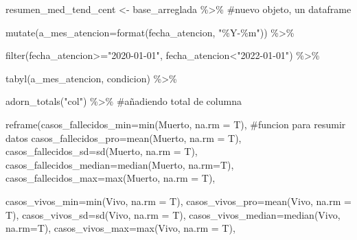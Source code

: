 \documentclass[
  letterpaper,
  DIV=11,
  numbers=noendperiod]{scrreprt}
\newenvironment{Shaded}{\begin{snugshade}}{\end{snugshade}}
\newcommand{\AttributeTok}[1]{\textcolor[rgb]{0.40,0.45,0.13}{#1}}
\newcommand{\CommentTok}[1]{\textcolor[rgb]{0.37,0.37,0.37}{#1}}
\newcommand{\FunctionTok}[1]{\textcolor[rgb]{0.28,0.35,0.67}{#1}}
\newcommand{\NormalTok}[1]{\textcolor[rgb]{0.00,0.23,0.31}{#1}}
\newcommand{\OtherTok}[1]{\textcolor[rgb]{0.00,0.23,0.31}{#1}}
\newcommand{\SpecialCharTok}[1]{\textcolor[rgb]{0.37,0.37,0.37}{#1}}
\newcommand{\StringTok}[1]{\textcolor[rgb]{0.13,0.47,0.30}{#1}}
\begin{document}
\begin{Shaded}
\begin{Highlighting}[]
\NormalTok{resumen\_med\_tend\_cent }\OtherTok{\textless{}{-}}\NormalTok{ base\_arreglada }\SpecialCharTok{\%\textgreater{}\%}  \CommentTok{\#nuevo objeto, un dataframe}
  
  \FunctionTok{mutate}\NormalTok{(}\AttributeTok{a\_mes\_atencion=}\FunctionTok{format}\NormalTok{(fecha\_atencion, }\StringTok{"\%Y{-}\%m"}\NormalTok{)) }\SpecialCharTok{\%\textgreater{}\%} 
 
   \FunctionTok{filter}\NormalTok{(fecha\_atencion}\SpecialCharTok{\textgreater{}=}\StringTok{"2020{-}01{-}01"}\NormalTok{, fecha\_atencion}\SpecialCharTok{\textless{}}\StringTok{"2022{-}01{-}01"}\NormalTok{) }\SpecialCharTok{\%\textgreater{}\%}
  
  \FunctionTok{tabyl}\NormalTok{(a\_mes\_atencion, condicion) }\SpecialCharTok{\%\textgreater{}\%}  
  
  \FunctionTok{adorn\_totals}\NormalTok{(}\StringTok{"col"}\NormalTok{) }\SpecialCharTok{\%\textgreater{}\%} \CommentTok{\#añadiendo total de columna}
  
  \FunctionTok{reframe}\NormalTok{(}\AttributeTok{casos\_fallecidos\_min=}\FunctionTok{min}\NormalTok{(Muerto, }\AttributeTok{na.rm =}\NormalTok{ T), }\CommentTok{\#funcion para resumir datos}
          \AttributeTok{casos\_fallecidos\_pro=}\FunctionTok{mean}\NormalTok{(Muerto, }\AttributeTok{na.rm =}\NormalTok{ T),}
          \AttributeTok{casos\_fallecidos\_sd=}\FunctionTok{sd}\NormalTok{(Muerto, }\AttributeTok{na.rm =}\NormalTok{ T),}
          \AttributeTok{casos\_fallecidos\_median=}\FunctionTok{median}\NormalTok{(Muerto, }\AttributeTok{na.rm=}\NormalTok{T),}
          \AttributeTok{casos\_fallecidos\_max=}\FunctionTok{max}\NormalTok{(Muerto, }\AttributeTok{na.rm =}\NormalTok{ T),}
          
          \AttributeTok{casos\_vivos\_min=}\FunctionTok{min}\NormalTok{(Vivo, }\AttributeTok{na.rm =}\NormalTok{ T),}
          \AttributeTok{casos\_vivos\_pro=}\FunctionTok{mean}\NormalTok{(Vivo, }\AttributeTok{na.rm =}\NormalTok{ T),}
          \AttributeTok{casos\_vivos\_sd=}\FunctionTok{sd}\NormalTok{(Vivo, }\AttributeTok{na.rm =}\NormalTok{ T),}
          \AttributeTok{casos\_vivos\_median=}\FunctionTok{median}\NormalTok{(Vivo, }\AttributeTok{na.rm=}\NormalTok{T),}
          \AttributeTok{casos\_vivos\_max=}\FunctionTok{max}\NormalTok{(Vivo, }\AttributeTok{na.rm =}\NormalTok{ T),}


\end{Highlighting}
\end{Shaded}
\end{document}
